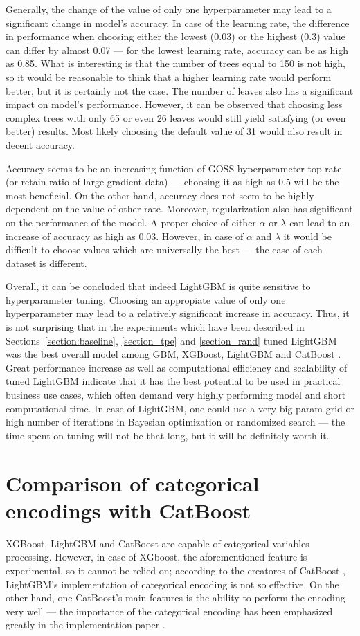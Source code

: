 \documentclass[magisterska, english]{pwr_wmat_praca_dyplomowa}
\theoremstyle{plain}
\numberwithin{theorem}{chapter}
\theoremstyle{definition}
\numberwithin{theorem}{chapter}
\newcommand{\gbm}{GBM, XGBoost, LightGBM and CatBoost }
\begin{document}
Generally, the change of the value of only one hyperparameter may lead to a significant change in model's accuracy. In case of the learning rate, the difference in performance when choosing either the lowest (0.03) or the highest (0.3) value can differ by almost 0.07 --- for the lowest learning rate, accuracy can be as high as 0.85. What is interesting is that the number of trees equal to 150 is not high, so it would be reasonable to think that a higher learning rate would perform better, but it is certainly not the case. The number of leaves also has a significant impact on model's performance. However, it can be observed that choosing less complex trees with only 65 or even 26 leaves would still yield satisfying (or even better) results. Most likely choosing the default value of 31 would also result in decent accuracy. 

Accuracy seems to be an increasing function of GOSS hyperparameter top rate (or retain ratio of large gradient data) --- choosing it as high as 0.5 will be the most beneficial. On the other hand, accuracy does not seem to be highly dependent on the value of other rate. Moreover, regularization also has significant on the performance of the model. A proper choice of either $\alpha$ or $\lambda$ can lead to an increase of accuracy as high as 0.03. However, in case of $\alpha$ and $\lambda$ it would be difficult to choose values which are universally the best --- the case of each dataset is different.

Overall, it can be concluded that indeed LightGBM is quite sensitive to hyperparameter tuning. Choosing an appropiate value of only one hyperparameter may lead to a relatively significant increase in accuracy. Thus, it is not surprising that in the experiments which have been described in Sections~\ref{section:baseline}, \ref{section_tpe} and \ref{section_rand} tuned LightGBM was the best overall model among \gbm. Great performance increase as well as computational efficiency and scalability of tuned LightGBM indicate that it has the best potential to be used in practical business use cases, which often demand very highly performing model and short computational time. In case of LightGBM, one could use a very big param grid or high number of iterations in Bayesian optimization or randomized search --- the time spent on tuning will not be that long, but it will be definitely worth it.

\section{Comparison of categorical encodings with CatBoost}\label{section:cat_comparison}
XGBoost, LightGBM and CatBoost are capable of categorical variables processing. However, in case of XGboost, the aforementioned feature is experimental, so it cannot be relied on; according to the creatores of CatBoost \cite{catboost}, LightGBM's implementation of categorical encoding is not so effective. On the other hand, one CatBoost's main features is the ability to perform the encoding very well --- the importance of the categorical encoding has been emphasized greatly in the implementation paper \cite{catboost}. 
\end{document}
